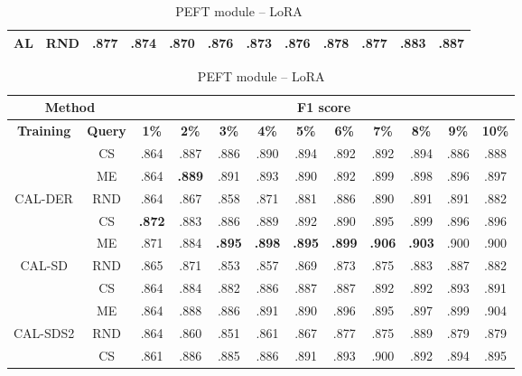 \begin{table}[htbp]
\begin{subtable}{\linewidth}
\begin{tabular}{c|c|cccccccccc}
\multirow{-3}{*}{\raggedright\arraybackslash AL} & RND & .877 & .874 & .870 & .876 & .873 & .876 & .878 & .877 & .883 & .887\\
\bottomrule
\end{tabular}
\end{subtable}
\vspace{1em}
\begin{subtable}{\linewidth}
\centering
\caption{PEFT module -- LoRA}

\begin{tabular}{c|c|cccccccccc}
\toprule
\multicolumn{2}{c|}{\textbf{Method}} & \multicolumn{10}{c}{\textbf{F1 score}} \\
\midrule
\textbf{Training} & \textbf{Query} & \textbf{1\%} & \textbf{2\%} & \textbf{3\%} & \textbf{4\%} & \textbf{5\%} & \textbf{6\%} & \textbf{7\%} & \textbf{8\%} & \textbf{9\%} & \textbf{10\%}\\
\midrule
 & CS & .864 & .887 & .886 & .890 & .894 & .892 & .892 & .894 & .886 & .888\\

 & ME & .864 & \textbf{.889} & .891 & .893 & .890 & .892 & .899 & .898 & .896 & .897\\

\multirow{-3}{*}{\raggedright\arraybackslash CAL-DER} & RND & .864 & .867 & .858 & .871 & .881 & .886 & .890 & .891 & .891 & .882\\
\midrule
 & CS & \textbf{.872} & .883 & .886 & .889 & .892 & .890 & .895 & .899 & .896 & .896\\

 & ME & .871 & .884 & \textbf{.895} & \textbf{.898} & \textbf{.895} & \textbf{.899} & \textbf{.906} & \textbf{.903} & .900 & .900\\

\multirow{-3}{*}{\raggedright\arraybackslash CAL-SD} & RND & .865 & .871 & .853 & .857 & .869 & .873 & .875 & .883 & .887 & .882\\
\midrule
 & CS & .864 & .884 & .882 & .886 & .887 & .887 & .892 & .892 & .893 & .891\\

 & ME & .864 & .888 & .886 & .891 & .890 & .896 & .895 & .897 & .899 & .904\\

\multirow{-3}{*}{\raggedright\arraybackslash CAL-SDS2} & RND & .864 & .860 & .851 & .861 & .867 & .877 & .875 & .889 & .879 & .879\\
\midrule
 & CS & .861 & .886 & .885 & .886 & .891 & .893 & .900 & .892 & .894 & .895\\


\end{tabular}
\end{subtable}
\end{table}

